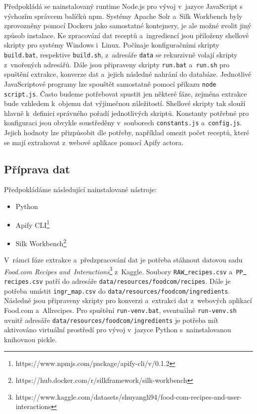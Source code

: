 \documentclass[12pt,a4paper]{report}
\begin{document}
Předpokládá se nainstalovaný runtime Node.js pro vývoj v~jazyce JavaScript s výchozím správcem balíčků npm. Systémy Apache Solr a~Silk Workbench byly zprovozněny pomocí Dockeru jako samostatné kontejnery, je ale možné zvolit jiný způsob instalace. Ke zpracování dat receptů a~ingrediencí jsou přiloženy shellové skripty pro systémy Windows i~Linux. Počínaje konfiguračními skripty \texttt{build.bat}, respektive \texttt{build.sh}, z~adresáře \texttt{data} se rekurzivně volají skripty z~vnořených adresářů. Dále jsou připraveny skripty \texttt{run.bat} a~\texttt{run.sh} pro spuštění extrakce, konverze dat a~jejich následné nahrání do databáze. Jednotlivé JavaScriptové programy lze spouštět samostatně pomocí příkazu \texttt{node\,script.js}. Často budeme potřebovat spustit jen některé fáze, zejména extrakce bude vzhledem k~objemu dat výjimečnou záležitostí. Shellové skripty tak slouží hlavně k~definici správného pořadí jednotlivých skriptů. Konstanty potřebné pro konfiguraci jsou obvykle soustředěny v~souborech \texttt{constants.js} a~\texttt{config.js}. Jejich hodnoty lze přizpůsobit dle potřeby, například omezit počet receptů, které se mají extrahovat z~webové aplikace pomocí Apify actora.

\subsection{Příprava dat}

Předpokládáme následující nainstalované nástroje:

\begin{itemize}
    \item Python
    \item Apify CLI\footnote{https://www.npmjs.com/package/apify-cli/v/0.1.2}
    \item Silk Workbench\footnote{https://hub.docker.com/r/silkframework/silk-workbench}
\end{itemize}

V~rámci fáze extrakce a~předzpracování dat je potřeba stáhnout datovou sadu \emph{Food.com Recipes and~Interactions}\footnote{https://www.kaggle.com/datasets/shuyangli94/food-com-recipes-and-user-interactions} z~Kaggle. Soubory \texttt{RAW\underline{{ }}recipes.csv} a~\texttt{PP\underline{{ }}recipes.csv} patří do adresáře \texttt{data/resources/foodcom/recipes}. Dále je potřeba umístit \texttt{ingr\underline{{ }}map.csv} do \texttt{data/resources/foodcom/ingredients}. Následně jsou připraveny skripty pro konverzi a~extrakci dat z~webových aplikací Food.com a~Allrecipes. Pro spuštění \texttt{run-venv.bat}, eventuálně \texttt{run-venv.sh} uvnitř adresáře \texttt{data/resources/foodcom/ingredients} je potřeba mít aktivováno virtuální prostředí pro vývoj v~jazyce Python s~nainstalovanou knihovnou pickle.
\end{document}
